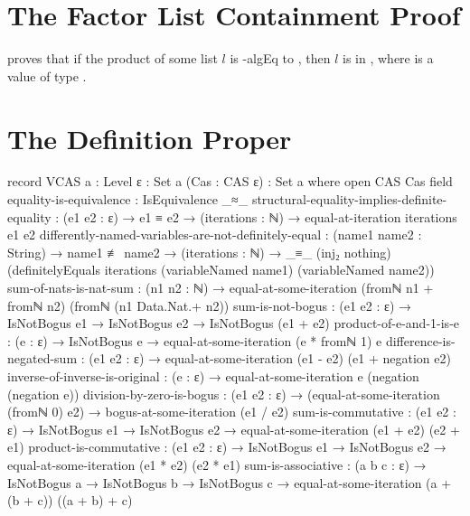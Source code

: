 \documentclass{report}
\begin{document}
\section{The Factor List Containment Proof}
  proves that if the product of some list \(l\) is -\gls{algEq} to , then \(l\) is in   , where  is a value of type  .

\section{The Definition Proper}

\begin{code}
record VCAS {a : Level} {ε : Set a} (Cas : CAS ε) : Set a where
  open CAS Cas
  field
    equality-is-equivalence : IsEquivalence _≈_
    structural-equality-implies-definite-equality :
      (e1 e2 : ε) →
      e1 ≡ e2 →
      (iterations : ℕ) →
      equal-at-iteration iterations e1 e2
    differently-named-variables-are-not-definitely-equal :
      (name1 name2 : String) →
      name1 ≢ name2 →
      (iterations : ℕ) →
      _≡_ (inj₂ nothing)
          (definitelyEquals iterations
                            (variableNamed name1)
                            (variableNamed name2))
    sum-of-nats-is-nat-sum :
      (n1 n2 : ℕ) →
      equal-at-some-iteration (fromℕ n1 + fromℕ n2) (fromℕ (n1 Data.Nat.+ n2))
    sum-is-not-bogus :
      (e1 e2 : ε) →
      IsNotBogus e1 →
      IsNotBogus e2 →
      IsNotBogus (e1 + e2)
    product-of-e-and-1-is-e :
      (e : ε) →
      IsNotBogus e →
      equal-at-some-iteration (e * fromℕ 1) e
    difference-is-negated-sum :
      (e1 e2 : ε) →
      equal-at-some-iteration (e1 - e2)
                              (e1 + negation e2)
    inverse-of-inverse-is-original :
      (e : ε) →
      equal-at-some-iteration e (negation (negation e))
    division-by-zero-is-bogus :
      (e1 e2 : ε) →
      (equal-at-some-iteration (fromℕ 0) e2) →
      bogus-at-some-iteration (e1 / e2)
    sum-is-commutative :
      (e1 e2 : ε) →
      IsNotBogus e1 →
      IsNotBogus e2 →
      equal-at-some-iteration (e1 + e2) (e2 + e1)
    product-is-commutative :
      (e1 e2 : ε) →
      IsNotBogus e1 →
      IsNotBogus e2 →
      equal-at-some-iteration (e1 * e2) (e2 * e1)
    sum-is-associative :
      (a b c : ε) →
      IsNotBogus a →
      IsNotBogus b →
      IsNotBogus c →
      equal-at-some-iteration (a + (b + c)) ((a + b) + c)

\end{code}
\end{document}
